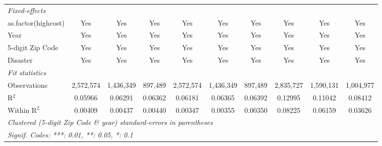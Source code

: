 \begin{tabular}{lccccccccc}
   \midrule
   \emph{Fixed-effects}\\
   as.factor(highcost)                                        & Yes            & Yes            & Yes            & Yes           & Yes            & Yes           & Yes           & Yes           & Yes\\  
   Year                                                       & Yes            & Yes            & Yes            & Yes           & Yes            & Yes           & Yes           & Yes           & Yes\\  
   5-digit Zip Code                                           & Yes            & Yes            & Yes            & Yes           & Yes            & Yes           & Yes           & Yes           & Yes\\  
   Disaster                                                   & Yes            & Yes            & Yes            & Yes           & Yes            & Yes           & Yes           & Yes           & Yes\\  
   \midrule
   \emph{Fit statistics}\\
   Observations                                               & 2,572,574      & 1,436,349      & 897,489        & 2,572,574     & 1,436,349      & 897,489       & 2,835,727     & 1,590,131     & 1,004,977\\  
   R$^2$                                                      & 0.05966        & 0.06291        & 0.06362        & 0.06181       & 0.06365        & 0.06392       & 0.12995       & 0.11042       & 0.08412\\  
   Within R$^2$                                               & 0.00409        & 0.00437        & 0.00440        & 0.00347       & 0.00355        & 0.00350       & 0.08225       & 0.06159       & 0.03626\\  
   \midrule \midrule
   \multicolumn{10}{l}{\emph{Clustered (5-digit Zip Code \& year) standard-errors in parentheses}}\\
   \multicolumn{10}{l}{\emph{Signif. Codes: ***: 0.01, **: 0.05, *: 0.1}}\\
\end{tabular}
\par\endgroup
